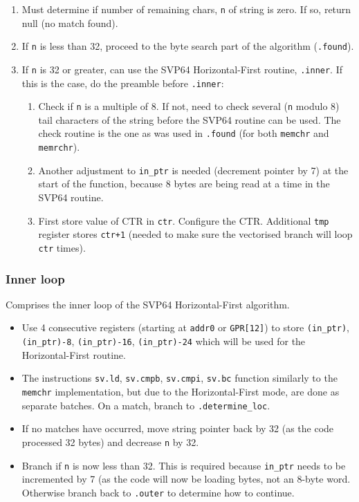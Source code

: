\begin{enumerate}
  \item Must determine if number of remaining chars, \texttt{n} of
  string is zero. If so, return null (no match found).
  \item If \texttt{n} is less than 32, proceed to the byte search part of
  the algorithm (\texttt{.found}).
  \item If \texttt{n} is 32 or greater, can use the SVP64 Horizontal-First
  routine, \texttt{.inner}. If this is the case, do the preamble
  before \texttt{.inner}:
  \begin{enumerate}
    \item Check if \texttt{n} is a multiple of 8. If not, need to check
    several (\texttt{n} modulo 8) tail characters of the string before the
    SVP64 routine can be used. The check routine is the one as was used in
    \texttt{.found} (for both \texttt{memchr} and \texttt{memrchr}).
    \item Another adjustment to \texttt{in\_ptr} is needed (decrement pointer
    by 7) at the start of the function, because 8 bytes are being read at
    a time in the \acrshort{SVP64} routine.
    \item First store value of \acrshort{CTR} in \texttt{ctr}.
    Configure the \acrshort{CTR}. Additional \texttt{tmp} register stores
    \texttt{ctr+1} (needed to make sure the vectorised branch will loop
    \texttt{ctr} times).
  \end{enumerate}
\end{enumerate}

\subsubsection{Inner loop}

Comprises the inner loop of the SVP64 Horizontal-First algorithm.

\begin{itemize}
  \item Use 4 consecutive registers (starting at \texttt{addr0} or
  \texttt{GPR[12]}) to store \texttt{(in\_ptr)}, \texttt{(in\_ptr)-8},
  \texttt{(in\_ptr)-16}, \texttt{(in\_ptr)-24} which will be used for
  the Horizontal-First routine.
  \item The instructions \texttt{sv.ld}, \texttt{sv.cmpb}, \texttt{sv.cmpi},
  \texttt{sv.bc} function similarly to the \texttt{memchr} implementation,
  but due to the Horizontal-First mode, are done as separate batches.
  On a match, branch to \texttt{.determine\_loc}.
  \item If no matches have occurred, move string pointer back by 32 (as the
  code processed 32 bytes) and decrease \texttt{n} by 32.
  \item Branch if \texttt{n} is now less than 32. This is required because
  \texttt{in\_ptr} needs to be incremented by 7 (as the code will now be
  loading bytes, not an 8-byte word. Otherwise branch back to \texttt{.outer}
  to determine how to continue.
\end{itemize}

